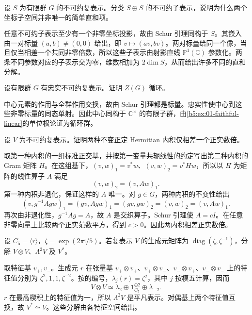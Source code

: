 \begin{exercise}\label{b5:ex:01-isotypic-diagonal}
	设 \(S\) 为有限群 \(G\) 的不可约复表示。分类 \(S\oplus S\) 的不可约子表示，说明为什么两个坐标子空间并非唯一的简单直和项。
\end{exercise}
\begin{solution}
	任意不可约子表示至少有一个非零坐标投影，故由 Schur 引理同构于 \(S\)。其嵌入由一对标量 \((a,b)\ne(0,0)\) 给出，即 \(v\mapsto(av,bv)\)。两对标量给同一个像，当且仅当相差一个共同非零倍数，所以这些子表示由射影直线 \(\mathbb P^1(\mathbb C)\) 参数化。两条不同参数对应的子表示交为零，维数相加为 \(2\dim S\)，从而给出许多不同的直和分解。
\end{solution}

\begin{exercise}\label{b5:ex:01-center-faithful}
	设有限群 \(G\) 有忠实不可约复表示。证明 \(Z(G)\) 循环。
\end{exercise}
\begin{solution}
	中心元素的作用与全群作用交换，故由 Schur 引理都是标量。忠实性使中心到这些非零标量的同态单射。因此中心同构于 \(\mathbb C^\times\) 的有限子群，由\cref{b5:ex:01-faithful-linear}的单位根论证为循环群。
\end{solution}

\begin{exercise}\label{b5:ex:01-invariant-hermitian}
	设 \(V\) 为不可约复表示。证明两种不变正定 Hermitian 内积仅相差一个正实数倍。
\end{exercise}
\begin{solution}
	取第一种内积的一组标准正交基，并按第一变量共轭线性的约定写出第二种内积的 Gram 矩阵 \(H\)。在这组基下，\((v,w)_1=v^*w\)、\((v,w)_2=v^*Hw\)，所以以 \(H\) 为矩阵的线性算子 \(A\) 满足
	\[
		(v,w)_2=(v,Aw)_1.
	\]
	第一种内积非退化，保证这样的 \(A\) 唯一。对 \(g\in G\)，两种内积的不变性给出
	\[
		(v,g^{-1}Agw)_1=(gv,Agw)_1 =(gv,gw)_2=(v,w)_2=(v,Aw)_1.
	\]
	再次由非退化性，\(g^{-1}Ag=A\)，故 \(A\) 是交织算子。Schur 引理使 \(A=cI\)。在任意非零向量上比较两个正实范数平方，得到 \(c>0\)。因此两内积相差正实数倍。
\end{solution}

\begin{exercise}\label{b5:ex:01-tensor-weights}
	设 \(C_5=\langle r\rangle\)，\(\zeta=\exp(2\pi\mathrm i/5)\)。若复表示 \(V\) 的生成元矩阵为 \(\operatorname{diag}(\zeta,\zeta^{-1})\)，分解 \(V\otimes V\)、\(\Lambda^2V\) 及 \(V^*\)。
\end{exercise}
\begin{solution}
	取特征基 \(v_+,v_-\)。生成元 \(r\) 在张量基 \(v_+\otimes v_+\)、\(v_+\otimes v_-\)、\(v_-\otimes v_+\)、\(v_-\otimes v_-\) 上的特征值分别为 \(\zeta^2,1,1,\zeta^{-2}\)。按的编号，\(\lambda_j(r)=\zeta^j\)，其中 \(j\) 按模五计算，因而
	\[
		V\otimes V\simeq\lambda_2\oplus\mathbf1_{C_5}^{\oplus2}\oplus\lambda_{-2}.
	\]
	\(r\) 在最高楔积上的特征值为一，所以 \(\Lambda^2V\) 是平凡表示。对偶基上两个特征值互换，故 \(V^*\simeq V\)。这些分解由各特征空间给出。
\end{solution}

